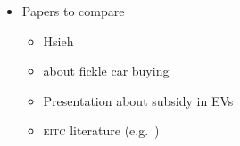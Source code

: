\documentclass[11pt,letterpaper,oneside]{article}
\newcommand{\eitc}{\textsc{eitc}}
\begin{document}
\begin{itemize}
    \item Papers to compare
    \begin{itemize}
        \item Hsieh
        \item \textcite{Busse2015_weather_on_cars} about fickle car buying
        \item Presentation about subsidy in EVs
        \item \eitc{} literature (e.g.\ \cite{goodman2008eitc})
    \end{itemize}
\end{itemize}

\pagebreak
\setcounter{page}{1}
\end{document}
